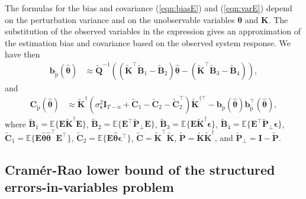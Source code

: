 The formulas for the bias and covariance (\ref{eqn:biasE}) and (\ref{eqn:varE}) depend on the perturbation variance and on the unobservable variables $\bm{\theta}$ and $\mathbf{K}$.
The substitution of the observed variables in the expression gives an approximation of the estimation bias and covariance based on the observed system response.
We have then
\begin{equation} \begin{aligned} \mathbf{b}_{\widetilde{\mathrm{p}}} \left( \widehat{\bm{\theta}} \right) & \approx \widetilde{\mathbf{Q}}^{-1} \left( \left( \widetilde{\mathbf{K}}^\top \widetilde{\mathbf{B}}_1 - \widetilde{\mathbf{B}}_2 \right) \widehat{\bm{\theta}} - \left( \widetilde{\mathbf{K}}^\top \widetilde{\mathbf{B}}_3 - \widetilde{\mathbf{B}}_4 \right) \right), \end{aligned} \label{eqn:biasST} \end{equation}
and
\begin{equation} \begin{aligned} \mathbf{C}_{\widetilde{\mathrm{p}}} \left( \widehat{\bm{\theta}} \right) & \approx \widetilde{\mathbf{K}}^\dagger \left( \sigma_{\bm{\epsilon}}^2 \mathbf{I}_{T-n} + \widetilde{\mathbf{C}}_1 - \widetilde{\mathbf{C}}_2 - \widetilde{\mathbf{C}}_2^\top \right) \widetilde{\mathbf{K}}^{\dagger \top} - \mathbf{b}_{\widetilde{\mathrm{p}}} \left( \widehat{\bm{\theta}} \right) \mathbf{b}_{\widetilde{\mathrm{p}}}^\top \left( \widehat{\bm{\theta}} \right) , \end{aligned} \label{eqn:varST} \end{equation}
where $\widetilde{\mathbf{B}}_1 = \mathbb{E} \Big\{ \mathbf{E} \widetilde{\mathbf{K}}^\dagger \mathbf{E} \Big\}$, $\widetilde{\mathbf{B}}_2 = \mathbb{E} \Big\{ \mathbf{E}^\top \widetilde{\mathbf{P}}_\perp \mathbf{E} \Big\}$, $\widetilde{\mathbf{B}}_3 = \mathbb{E} \Big\{ \mathbf{E} \widetilde{\mathbf{K}}^\dagger \bm{\epsilon} \Big\}$, $\widetilde{\mathbf{B}}_4 = \mathbb{E} \Big\{ \mathbf{E}^\top \widetilde{\mathbf{P}}_\perp \bm{\epsilon} \Big\}$, $\widetilde{\mathbf{C}}_1 = \mathbb{E} \Big\{ \mathbf{E} \widehat{\bm{\theta}} \widehat{\bm{\theta}}^\top \mathbf{E}^\top \Big\}$, $\widetilde{\mathbf{C}}_2 = \mathbb{E} \Big\{ \mathbf{E} \widehat{\bm{\theta}} \bm{\epsilon}^\top \Big\}$, $\widetilde{\mathbf{C}} = \widetilde{\mathbf{K}}^\top \widetilde{\mathbf{K}}$, $\widetilde{\mathbf{P}} = \widetilde{\mathbf{K}} \widetilde{\mathbf{K}}^\dagger$, and $\widetilde{\mathbf{P}}_\perp = \mathbf{I} - \widetilde{\mathbf{P}}$.

\subsection{Cram\'er-Rao lower bound of the structured errors-in-variables problem}

